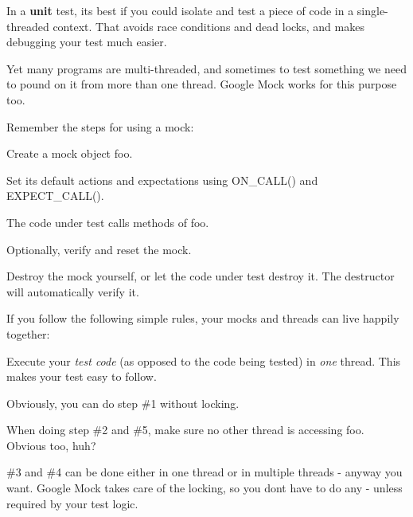 In a {\bfseries unit} test, it\textquotesingle{}s best if you could isolate and test a piece of code in a single-\/threaded context. That avoids race conditions and dead locks, and makes debugging your test much easier.

Yet many programs are multi-\/threaded, and sometimes to test something we need to pound on it from more than one thread. Google Mock works for this purpose too.

Remember the steps for using a mock\+:


\begin{DoxyEnumerate}
\item Create a mock object {\ttfamily foo}.
\end{DoxyEnumerate}
\begin{DoxyEnumerate}
\item Set its default actions and expectations using {\ttfamily O\+N\+\_\+\+C\+A\+L\+L()} and {\ttfamily E\+X\+P\+E\+C\+T\+\_\+\+C\+A\+L\+L()}.
\end{DoxyEnumerate}
\begin{DoxyEnumerate}
\item The code under test calls methods of {\ttfamily foo}.
\end{DoxyEnumerate}
\begin{DoxyEnumerate}
\item Optionally, verify and reset the mock.
\end{DoxyEnumerate}
\begin{DoxyEnumerate}
\item Destroy the mock yourself, or let the code under test destroy it. The destructor will automatically verify it.
\end{DoxyEnumerate}

If you follow the following simple rules, your mocks and threads can live happily together\+:


\begin{DoxyItemize}
\item Execute your {\itshape test code} (as opposed to the code being tested) in {\itshape one} thread. This makes your test easy to follow.
\item Obviously, you can do step \#1 without locking.
\item When doing step \#2 and \#5, make sure no other thread is accessing {\ttfamily foo}. Obvious too, huh?
\item \#3 and \#4 can be done either in one thread or in multiple threads -\/ anyway you want. Google Mock takes care of the locking, so you don\textquotesingle{}t have to do any -\/ unless required by your test logic.
\end{DoxyItemize}

